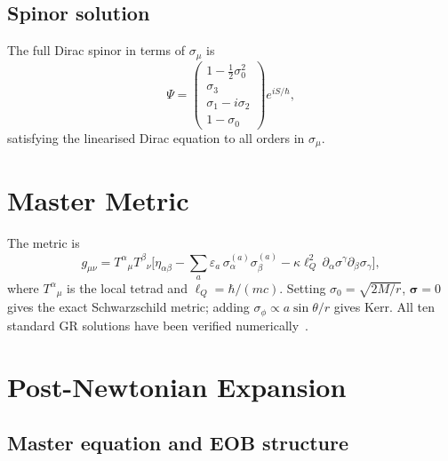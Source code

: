 \documentclass[twocolumn,aps,prd,showpacs,superscriptaddress,floatfix]{revtex4-2}
\begin{document}
\subsection{Spinor solution}

The full Dirac spinor in terms of $\sigma_\mu$ is
\begin{equation}
  \Psi =
  \begin{pmatrix}
    1-\tfrac12\sigma_0^2 \\ \sigma_3 \\ \sigma_1-i\sigma_2 \\ 1-\sigma_0
  \end{pmatrix}
  e^{iS/\hbar},
\end{equation}
satisfying the linearised Dirac equation to all orders in $\sigma_\mu$.

\section{Master Metric}
\label{sec:metric}

The metric is
\begin{equation}
  g_{\mu\nu} = T^\alpha{}_\mu T^\beta{}_\nu
    \bigl[\eta_{\alpha\beta}
      -\textstyle\sum_a\varepsilon_a\,\sigma_\alpha^{(a)}\sigma_\beta^{(a)}
      -\kappa\ell_Q^2\,\partial_\alpha\sigma^\gamma\partial_\beta\sigma_\gamma
    \bigr],
  \label{eq:metric}
\end{equation}
where $T^\alpha{}_\mu$ is the local tetrad and $\ell_Q=\hbar/(mc)$.
Setting $\sigma_0=\sqrt{2M/r}$, $\boldsymbol\sigma=0$ gives the exact
Schwarzschild metric; adding $\sigma_\phi\propto a\sin\theta/r$ gives Kerr.
All ten standard GR solutions have been verified
numerically~\cite{Python:2026qgd}.

\section{Post-Newtonian Expansion}
\label{sec:pn}

\subsection{Master equation and EOB structure}
\end{document}
